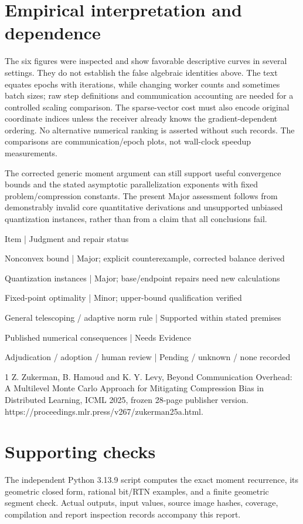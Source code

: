 \documentclass[10pt]{article}
\begin{document}
\section*{Empirical interpretation and dependence}
The six figures were inspected and show favorable descriptive curves in several settings. They do not establish the false algebraic identities above. The text equates epochs with iterations, while changing worker counts and sometimes batch sizes; raw step definitions and communication accounting are needed for a controlled scaling comparison. The sparse-vector cost must also encode original coordinate indices unless the receiver already knows the gradient-dependent ordering. No alternative numerical ranking is asserted without such records. The comparisons are communication/epoch plots, not wall-clock speedup measurements.\par
The corrected generic moment argument can still support useful convergence bounds and the stated asymptotic parallelization exponents with fixed problem/compression constants. The present Major assessment follows from demonstrably invalid core quantitative derivations and unsupported unbiased quantization instances, rather than from a claim that all conclusions fail.\par
Item | Judgment and repair status\par
Nonconvex bound | Major; explicit counterexample, corrected balance derived\par
Quantization instances | Major; base/endpoint repairs need new calculations\par
Fixed-point optimality | Minor; upper-bound qualification verified\par
General telescoping / adaptive norm rule | Supported within stated premises\par
Published numerical consequences | Needs Evidence\par
Adjudication / adoption / human review | Pending / unknown / none recorded\par
1 Z. Zukerman, B. Hamoud and K. Y. Levy, Beyond Communication Overhead: A Multilevel Monte Carlo Approach for Mitigating Compression Bias in Distributed Learning, ICML 2025, frozen 28-page publisher version. https://proceedings.mlr.press/v267/zukerman25a.html.\par
\section*{Supporting checks}
The independent Python 3.13.9 script computes the exact moment recurrence, its geometric closed form, rational bit/RTN examples, and a finite geometric segment check. Actual outputs, input values, source image hashes, coverage, compilation and report inspection records accompany this report.\par
\end{document}
